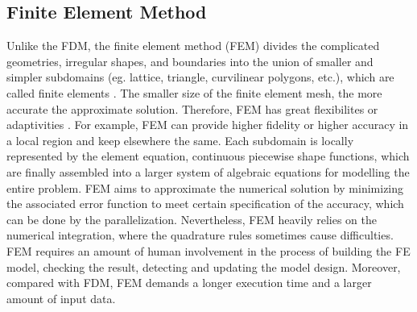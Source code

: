 \subsection{Finite Element Method}


Unlike the FDM, the finite element method
(FEM) \cite{zlamal1968finite} divides the complicated geometries,
irregular shapes, and boundaries into the union of smaller and simpler
subdomains (eg. lattice, triangle, curvilinear polygons, etc.), which
are called finite elements \cite{logan2011first}. The smaller size of
the finite element mesh, the more accurate the approximate
solution. Therefore, FEM has great flexibilites or
adaptivities \cite{reddy1993introduction}. For example, FEM can
provide higher fidelity or higher accuracy in a local region and keep
elsewhere the same. Each subdomain is locally represented by the
element equation, continuous piecewise shape functions, which are
finally assembled into a larger system of algebraic equations for
modelling the entire problem. FEM aims to approximate the numerical
solution by minimizing the associated error function to meet certain
specification of the accuracy, which can be done by the
parallelization. Nevertheless, FEM heavily relies on the numerical
integration, where the quadrature rules sometimes cause
difficulties. FEM requires an amount of human involvement in the
process of building the FE model, checking the result, detecting and
updating the model design. Moreover, compared with FDM, FEM demands a
longer execution time and a larger amount of input data.

